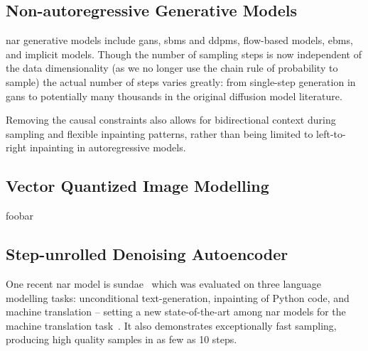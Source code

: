 \subsection{Non-autoregressive Generative Models}
\label{subsec:nagm}
\acrfull{nar} generative models include \glspl{gan}, \glspl{sbm} and
\glspl{ddpm}, flow-based models, \glspl{ebm}, and implicit models. Though the
number of sampling steps is now independent of the data dimensionality (as we no
longer use the chain rule of probability to sample) the actual number of steps
varies greatly: from single-step generation in \glspl{gan} to potentially many
thousands in the original diffusion model literature.


Removing the causal constraints also allows for bidirectional context during
sampling and flexible inpainting patterns, rather than being limited to
left-to-right inpainting in autoregressive models.

\subsection{Vector Quantized Image Modelling}
\label{subsec:vqmodelling}

foobar

\subsection{Step-unrolled Denoising Autoencoder}
\label{subsec:sundae}
One recent \gls{nar} model is \gls{sundae}~\cite{savinov2022stepunrolled} which
was evaluated on three language modelling tasks: unconditional text-generation,
inpainting of Python code, and machine translation -- setting a new
state-of-the-art among \gls{nar} models for the machine translation
task~\cite{savinov2022stepunrolled}. It also demonstrates exceptionally fast
sampling, producing high quality samples in as few as 10 steps.

